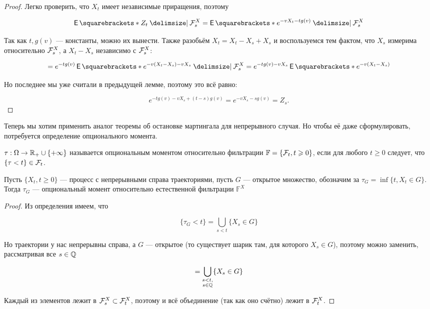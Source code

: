 \begin{proof}
  Легко проверить, что $X_t$ имеет независимые приращения, поэтому 

  \[
    \E{Z_t \given \F_s^X} = \E{e^{-vX_t - tg(v)} \given \F_s^X}
  \]

  Так как $t, g(v)$ --- константы, можно их вынести. Также разобьём
  $X_t = X_t - X_s + X_s$ и воспользуемся тем фактом, что $X_s$ измерима
  относительно $\mathcal{F}_s^X$, а $X_t - X_s$ независимо с $\mathcal{F}_s^X$:

  \[
    = e^{-t g(v)}\E{e^{-v(X_t - X_s) - vX_s} \given \F_s^X} =
    e^{-t g(v) -vX_s} \E{e^{-v(X_t - X_s)}}
  \]

  Но последнее мы уже считали в предыдущей лемме, поэтому это всё равно:

  \[
    e^{-t g(v) - vX_s + (t - s)g(v)} = e^{-vX_s - s g(v)} = Z_s.
  \]
\end{proof}

Теперь мы хотим применить аналог теоремы об остановке мартингала для непрерывного
случая. Но чтобы её даже сформулировать, потребуется определение опционального
момента.

\begin{definition}
  $\tau: \Omega \to \mathbb{R}_+ \cup \{+\infty\}$ называется опциональным моментом 
  относительно фильтрации $\mathbb{F} = \{\mathcal{F}_t, t \geqslant 0\}$, если для любого
  $t \geq 0$ следует, что $\{\tau < t\} \in \mathcal{F}_t$.
\end{definition}

\begin{lemma}
  Пусть $\{X_t, t \geq 0\}$ --- процесс с непрерывными справа траекториями,
  пусть $G$ --- открытое множество, обозначим за $\tau_G = \inf\{t, X_t \in G\}$.
  Тогда $\tau_G$ --- опциональный момент относительно естественной фильтрации
  $\mathbb{F}^X$
\end{lemma}

\begin{proof}
  Из определения имеем, что

  \[
    \{\tau_G < t\} = \bigcup\limits_{s < t} \{X_s \in G\}
  \]

  Но траектории у нас непрерывны справа, а $G$ --- открытое (то существует шарик
  там, для которого $X_s \in G$), поэтому можно заменить, рассматривая
  все $s \in \mathbb{Q}$

  \[
    = \bigcup\limits_{\substack{s < t,\\s \in \mathbb{Q}}} \{X_s \in G\}
  \]

  Каждый из элементов лежит в $\mathcal{F}_s^X \subset \mathcal{F}_t^X$, поэтому и всё объединение
  (так как оно счётно) лежит в $\mathcal{F}_t^X$.
\end{proof}

